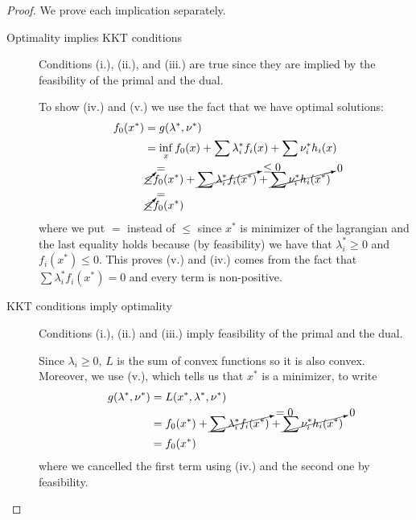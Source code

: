 \documentclass[12pt]{extarticle}
\begin{document}
\begin{proof}
	We prove each implication separately.
	\begin{description}
		\item[Optimality implies KKT conditions]
		      Conditions (i.), (ii.), and (iii.) are true since they are implied
		      by the feasibility of the primal and the dual.

		      To show (iv.) and (v.) we use the fact that we have optimal solutions:
		      \begin{align}
			      f_0(x^*) & = g(\lambda^*, \nu^*)                                                                                            \\
			               & = \inf_{x} f_0(x) + \sum \lambda_i^* f_i(x) + \sum \nu_i^* h_i(x)                                                \\
			               & \cancelto{=}{\leq} f_0(x^*) + \cancelto{\leq 0}{\sum \lambda_i^* f_i(x^*)} + \cancelto{0}{\sum \nu_i^* h_i(x^*)} \\
			               & \cancelto{=}{\leq} f_0(x^*)
		      \end{align}
		      where we put $=$ instead of $\leq$ since $x^*$ is minimizer of the lagrangian and
		      the last equality holds because (by feasibility) we have that $\lambda_i^* \geq 0$
		      and $f_i(x^*) \leq 0$.
		      This proves (v.) and (iv.) comes from the fact that $\sum \lambda_i^* f_i(x^*) = 0$
		      and every term is non-positive.
		\item[KKT conditions imply optimality]
		      Conditions (i.), (ii.) and (iii.) imply feasibility of the primal and the dual.

		      Since $\lambda_i \geq 0$, $L$ is the sum of convex functions so it is also convex.
		      Moreover, we use (v.), which tells us that $x^*$ is a minimizer, to write
		      \begin{align}
			      g(\lambda^*, \nu^*) & = L(x^*, \lambda^*, \nu^*)                                                                   \\
			                          & = f_0(x^*) + \cancelto{= 0}{\sum \lambda_i^* f_i(x^*)} + \cancelto{0}{\sum \nu_i^* h_i(x^*)} \\
			                          & = f_0(x^*)
		      \end{align}
		      where we cancelled the first term using (iv.) and the second one by feasibility.
		      \qedhere
	\end{description}
\end{proof}
\end{document}
